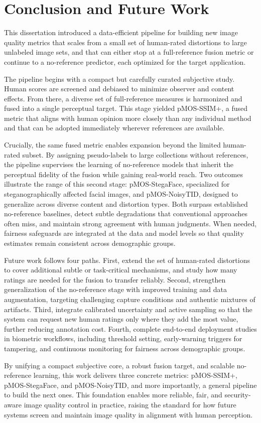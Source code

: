 \chapter{Conclusion and Future Work}

This dissertation introduced a data-efficient pipeline for building new image quality metrics that scales from a small set of human-rated distortions to large unlabeled image sets, and that can either stop at a full-reference fusion metric or continue to a no-reference predictor, each optimized for the target application.

The pipeline begins with a compact but carefully curated subjective study. Human scores are screened and debiased to minimize observer and content effects. From there, a diverse set of full-reference measures is harmonized and fused into a single perceptual target. This stage yielded \acs{pMOS-SSIM+}, a fused metric that aligns with human opinion more closely than any individual method and that can be adopted immediately wherever references are available.

Crucially, the same fused metric enables expansion beyond the limited human-rated subset. By assigning pseudo-labels to large collections without references, the pipeline supervises the learning of no-reference models that inherit the perceptual fidelity of the fusion while gaining real-world reach. Two outcomes illustrate the range of this second stage: \acs{pMOS-StegaFace}, specialized for steganographically affected facial images, and \acs{pMOS-NoisyTID}, designed to generalize across diverse content and distortion types. Both surpass established no-reference baselines, detect subtle degradations that conventional approaches often miss, and maintain strong agreement with human judgments. When needed, fairness safeguards are integrated at the data and model levels so that quality estimates remain consistent across demographic groups.

Future work follows four paths. First, extend the set of human-rated distortions to cover additional subtle or task-critical mechanisms, and study how many ratings are needed for the fusion to transfer reliably. Second, strengthen generalization of the no-reference stage with improved training and data augmentation, targeting challenging capture conditions and authentic mixtures of artifacts. Third, integrate calibrated uncertainty and active sampling so that the system can request new human ratings only where they add the most value, further reducing annotation cost. Fourth, complete end-to-end deployment studies in biometric workflows, including threshold setting, early-warning triggers for tampering, and continuous monitoring for fairness across demographic groups.

By unifying a compact subjective core, a robust fusion target, and scalable no-reference learning, this work delivers three concrete metrics: \acs{pMOS-SSIM+}, \acs{pMOS-StegaFace}, and \acs{pMOS-NoisyTID}, and more importantly, a general pipeline to build the next ones. This foundation enables more reliable, fair, and security-aware image quality control in practice, raising the standard for how future systems screen and maintain image quality in alignment with human perception.
